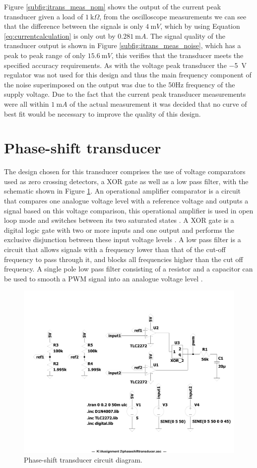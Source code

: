 Figure \ref{subfig:itrans_meas_nom} shows the output of the current peak transducer given a load of  $\SI{1}{\kilo \Omega}$, from the oscilloscope measurements we can see that the difference between the signals is only $\SI{4}{\milli V}$, which by using Equation \ref{eq:currentcalculation} is only out by $\SI{0.281}{\milli A}$. The signal quality of the transducer output is shown in Figure \ref{subfig:itrans_meas_noise}, which has a peak to peak range of only $\SI{15.6}{\milli V}$, this verifies that the transducer meets the specified accuracy requirements. As with the voltage peak transducer the \SI{-5}{\volt} regulator was not used for this design and thus the main frequency component of the noise superimposed on the output was due to the 50Hz frequency of the supply voltage. \vspace{4mm} \newline Due to the fact that the current peak transducer measurements were all within $\SI{1}{\milli A}$ of the actual measurement it was decided that no curve of best fit would be necessary to improve the quality of this design.

\section{Phase-shift transducer}\label{sec:ptrans}
The design chosen for this transducer comprises the use of voltage comparators used as zero crossing detectors, a XOR gate as well as a low pass filter, with the schematic shown in Figure \ref{fig:ptrans_circuit_diagram}. An operational amplifier comparator is a circuit that compares one analogue voltage level with a reference voltage and outputs a signal based on this voltage comparison, this operational amplifier is used in open loop mode and switches between its two saturated states \cite{OpAmpComparator}. A XOR gate is a digital logic gate with two or more inputs and one output and performs the exclusive disjunction between these input voltage levels \cite{XORGate}. A low pass filter is a circuit that allows signals with a frequency lower than that of the cut-off frequency to pass through it, and blocks all frequencies higher than the cut off frequency. A single pole low pass filter consisting of a resistor and a capacitor can be used to smooth a PWM signal into an analogue voltage level \cite{PWMref}.
\begin{figure} [!ht]
  \centering
        \includegraphics[width=0.5\linewidth]{./Figures/ptrans_circuit_diagram.pdf}
		    \caption{Phase-shift transducer circuit diagram.} \label{fig:ptrans_circuit_diagram}
 \end{figure}
 
